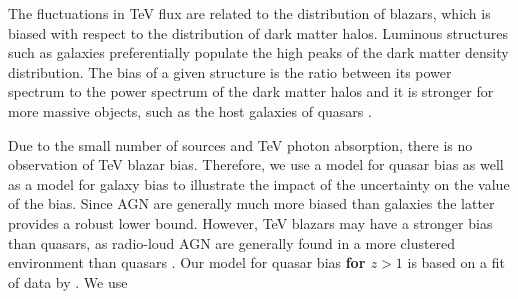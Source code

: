 \documentclass[numberedappendix]{emulateapj}
\newcommand\ALc[1]{{\color{red} \bf #1}} %
\begin{document}
The fluctuations in TeV flux are related to the distribution of blazars, which is biased with respect to the distribution of dark matter halos. Luminous structures such as galaxies preferentially populate the high peaks of the dark matter density distribution. The bias of a given structure is the ratio between its power spectrum to the power spectrum of the dark matter halos and it is stronger for more massive objects, such as the host galaxies of quasars \citep[see, e.g.][for a review]{2002PhR...372....1C}.

Due to the small number of sources and TeV photon absorption, there is no observation of TeV blazar bias.  Therefore, we  use a model for quasar bias as well as a model for galaxy bias to illustrate the impact of the uncertainty on the value of the bias. Since AGN are generally much more biased than galaxies the latter provides a robust lower bound. However, TeV blazars may have a stronger bias than quasars, as radio-loud AGN are generally found in a more clustered environment than quasars \citep{2009MNRAS.393..377M,2012MNRAS.421.3060S}. Our model for quasar  bias \ALc{for $z>1$} is based on a fit of data by \citet{2005MNRAS.356..415C,2007ApJ...658...85M,2007AJ....133.2222S}. We use
\end{document}
